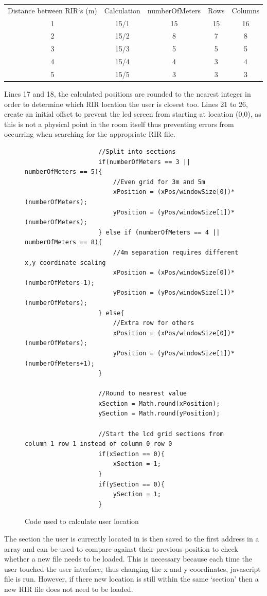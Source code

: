 \documentclass[../../main.tex]{subfiles}
\begin{document}
					\begin{center}
					\begin{tabular}{c c c c c}
						Distance between \ac{RIR}`s (m) & Calculation & numberOfMeters & Rows & Columns\\
						1 & 15/1 & 15 & 15 & 16\\
						2 & 15/2 & 8 & 7 & 8\\
						3 & 15/3 & 5 & 5 & 5\\
						4 & 15/4 & 4 & 3 & 4\\
						5 & 15/5 & 3 & 3 & 3\\
					\end{tabular}
				\end{center}

				Lines 17 and 18, the calculated positions are rounded to the nearest integer in order to determine which \ac{RIR} location the user is closest too. Lines 21 to 26, create an initial offset to prevent the lcd screen from starting at location (0,0), as this is not a physical point in the room itself thus preventing errors from occurring when searching for the appropriate \ac{RIR} file.

				\begin{figure}[H]
				\begin{lstlisting}
					//Split into sections
					if(numberOfMeters == 3 || numberOfMeters == 5){
						//Even grid for 3m and 5m
						xPosition = (xPos/windowSize[0])*(numberOfMeters);
						yPosition = (yPos/windowSize[1])*(numberOfMeters);
					} else if (numberOfMeters == 4 || numberOfMeters == 8){
						//4m separation requires different x,y coordinate scaling
						xPosition = (xPos/windowSize[0])*(numberOfMeters-1);
						yPosition = (yPos/windowSize[1])*(numberOfMeters);
					} else{
						//Extra row for others
						xPosition = (xPos/windowSize[0])*(numberOfMeters); 
						yPosition = (yPos/windowSize[1])*(numberOfMeters+1);
					}	

					//Round to nearest value
					xSection = Math.round(xPosition);
					ySection = Math.round(yPosition); 
					
					//Start the lcd grid sections from column 1 row 1 instead of column 0 row 0
					if(xSection == 0){
						xSection = 1; 
					}
					if(ySection == 0){
						ySection = 1;
					}
					\end{lstlisting}
					\caption{Code used to calculate user location}
					\label{jsPosition}
					\end{figure}

					 The section the user is currently located in is then saved to the first address in a array and can be used to compare against their previous position to check whether a new file needs to be loaded. This is necessary because each time the user touched the user interface, thus changing the x and y coordinates, javascript file is run. However, if there new location is still within the same `section' then a new \ac{RIR} file does not need to be loaded.
\end{document}
